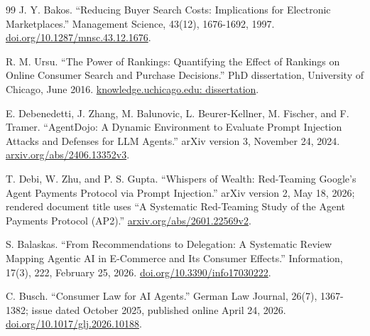 \documentclass{article}
\begin{document}
\begin{thebibliography}{99}
J. Y. Bakos. ``Reducing Buyer Search Costs: Implications for Electronic Marketplaces.'' Management Science, 43(12), 1676-1692, 1997. \href{https://doi.org/10.1287/mnsc.43.12.1676}{doi.org/10.1287/mnsc.43.12.1676}.

R. M. Ursu. ``The Power of Rankings: Quantifying the Effect of Rankings on Online Consumer Search and Purchase Decisions.'' PhD dissertation, University of Chicago, June 2016. \href{https://knowledge.uchicago.edu/records/w2hvk-p7722/files/Ursu_uchicago_0330D_13283.pdf?download=1}{knowledge.uchicago.edu: dissertation}.

E. Debenedetti, J. Zhang, M. Balunovic, L. Beurer-Kellner, M. Fischer, and F. Tramer. ``AgentDojo: A Dynamic Environment to Evaluate Prompt Injection Attacks and Defenses for LLM Agents.'' arXiv version 3, November 24, 2024. \href{https://arxiv.org/abs/2406.13352v3}{arxiv.org/abs/2406.13352v3}.

T. Debi, W. Zhu, and P. S. Gupta. ``Whispers of Wealth: Red-Teaming Google's Agent Payments Protocol via Prompt Injection.'' arXiv version 2, May 18, 2026; rendered document title uses ``A Systematic Red-Teaming Study of the Agent Payments Protocol (AP2).'' \href{https://arxiv.org/abs/2601.22569v2}{arxiv.org/abs/2601.22569v2}.

S. Balaskas. ``From Recommendations to Delegation: A Systematic Review Mapping Agentic AI in E-Commerce and Its Consumer Effects.'' Information, 17(3), 222, February 25, 2026. \href{https://doi.org/10.3390/info17030222}{doi.org/10.3390/info17030222}.

C. Busch. ``Consumer Law for AI Agents.'' German Law Journal, 26(7), 1367-1382; issue dated October 2025, published online April 24, 2026. \href{https://doi.org/10.1017/glj.2026.10188}{doi.org/10.1017/glj.2026.10188}.
\end{thebibliography}
\endgroup
\end{document}
